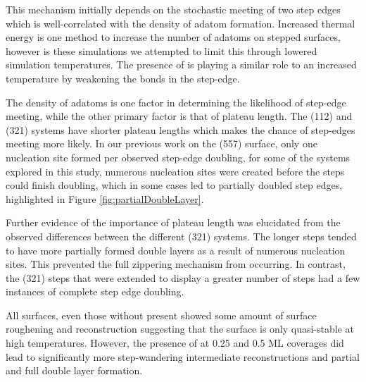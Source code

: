 This mechanism initially depends on the stochastic meeting of two step edges
which is well-correlated with the density of adatom formation. Increased
thermal energy is one method to increase the number of adatoms on stepped
surfaces, however is these simulations we attempted to limit this through
lowered simulation temperatures.  The presence of  is playing a similar
role to an increased temperature by weakening the  bonds in
the step-edge.

The density of adatoms is one factor in determining the likelihood of step-edge
meeting, while the other primary factor is that of plateau length. The (112)
and (321) systems have shorter plateau lengths which makes the chance of
step-edges meeting more likely.  In our previous work on the (557) surface,
only one nucleation site formed per observed step-edge doubling, for some of
the systems explored in this study, numerous nucleation sites were created
before the steps could finish doubling, which in some cases led to partially
doubled step edges, highlighted in Figure \ref{fig:partialDoubleLayer}.

Further evidence of the importance of plateau length was elucidated from the
observed differences between the different (321) systems. The
longer steps tended to have more partially formed double layers as
a result of numerous nucleation sites. This prevented the full
zippering mechanism from occurring. In contrast, the (321) steps that were
extended to display a greater number of steps had a few
instances of complete step edge doubling.

All surfaces, even those without  present showed some amount of surface
roughening and reconstruction suggesting that the surface is only quasi-stable
at high temperatures. However, the presence of  at 0.25 and 0.5 ML
coverages did lead to significantly more step-wandering intermediate
reconstructions and partial and full double layer formation.




